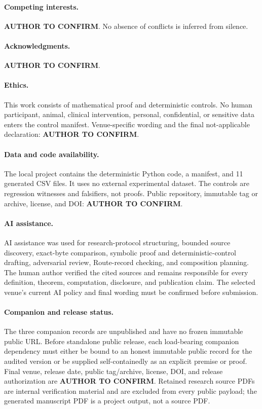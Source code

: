 \documentclass[11pt]{article}
\theoremstyle{definition}
\begin{document}
\paragraph{Competing interests.}
\textbf{AUTHOR TO CONFIRM}.  No absence of conflicts is inferred from
silence.

\paragraph{Acknowledgments.}
\textbf{AUTHOR TO CONFIRM}.

\paragraph{Ethics.}
This work consists of mathematical proof and deterministic controls.  No
human participant, animal, clinical intervention, personal, confidential,
or sensitive data enters the control manifest.  Venue-specific wording and
the final not-applicable declaration: \textbf{AUTHOR TO CONFIRM}.

\paragraph{Data and code availability.}
The local project contains the deterministic Python code, a manifest, and
11 generated CSV files.  It uses no external experimental dataset.  The
controls are regression witnesses and falsifiers, not proofs.  Public
repository, immutable tag or archive, license, and DOI:
\textbf{AUTHOR TO CONFIRM}.

\paragraph{AI assistance.}
AI assistance was used for research-protocol structuring, bounded source
discovery, exact-byte comparison, symbolic proof and deterministic-control
drafting, adversarial review, Route-record checking, and composition
planning.  The human author verified the cited sources and remains
responsible for every definition, theorem, computation, disclosure, and
publication claim.  The selected venue's current AI policy and final wording
must be confirmed before submission.

\paragraph{Companion and release status.}
The three companion records are unpublished and have no frozen immutable
public URL.  Before standalone public release, each load-bearing companion
dependency must either be bound to an honest immutable public record for the
audited version or be supplied self-containedly as an explicit premise or
proof.  Final venue, release date, public tag/archive, license, DOI, and
release authorization are \textbf{AUTHOR TO CONFIRM}.  Retained research
source PDFs are internal verification material and are excluded from every
public payload; the generated manuscript PDF is a project output, not a
source PDF.


\begingroup
\raggedright

\endgroup
\end{document}
